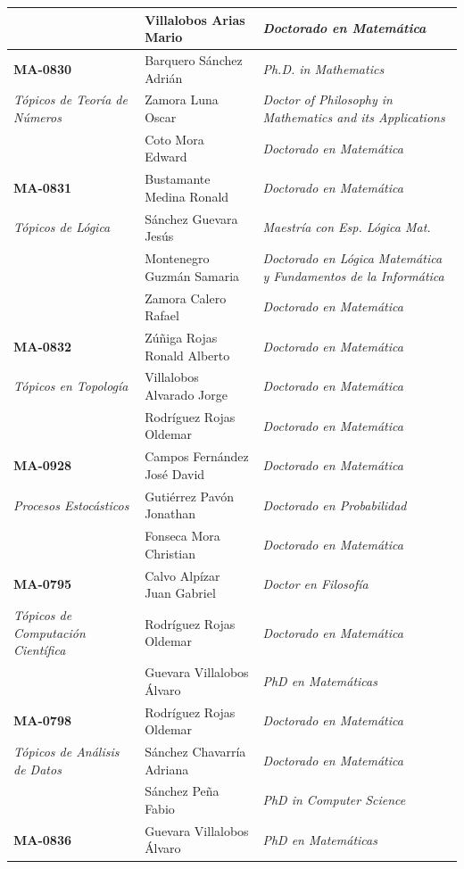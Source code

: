\begin{landscape}
\begin{longtable}{|>{\columncolor{Celeste-UCR!12}\raggedright\arraybackslash}p{6cm}|>{\raggedright\arraybackslash}p{6.6cm}|>{\raggedright\arraybackslash}p{7.6cm}|}
 & Villalobos Arias Mario & \textit{Doctorado en Matemática} \\
\hline
\textbf{MA-0830} & Barquero Sánchez Adrián & \textit{Ph.D. in Mathematics} \\
\textit{Tópicos de Teoría de Números} & Zamora Luna Oscar & \textit{Doctor of Philosophy in Mathematics and its Applications} \\
 & Coto Mora Edward & \textit{Doctorado en Matemática} \\
\hline
\textbf{MA-0831} & Bustamante Medina Ronald & \textit{Doctorado en Matemática} \\
\textit{Tópicos de Lógica} & Sánchez Guevara Jesús & \textit{Maestría con Esp. Lógica Mat.} \\
 & Montenegro Guzmán Samaria & \textit{Doctorado en Lógica Matemática y Fundamentos de la Informática} \\
 & Zamora Calero Rafael & \textit{Doctorado en Matemática} \\
\hline
\textbf{MA-0832} & Zúñiga Rojas Ronald Alberto & \textit{Doctorado en Matemática} \\
\textit{Tópicos en Topología} & Villalobos Alvarado Jorge & \textit{Doctorado en Matemática} \\
 & Rodríguez Rojas Oldemar & \textit{Doctorado en Matemática} \\
\hline
\textbf{MA-0928} & Campos Fernández José David & \textit{Doctorado en Matemática} \\
\textit{Procesos Estocásticos} & Gutiérrez Pavón Jonathan & \textit{Doctorado en Probabilidad} \\
 & Fonseca Mora Christian & \textit{Doctorado en Matemática} \\
\hline
\textbf{MA-0795} & Calvo Alpízar Juan Gabriel & \textit{Doctor en Filosofía} \\
\textit{Tópicos de Computación Científica} & Rodríguez Rojas Oldemar & \textit{Doctorado en Matemática} \\
 & Guevara Villalobos Álvaro & \textit{PhD en Matemáticas} \\
\hline
\textbf{MA-0798} & Rodríguez Rojas Oldemar & \textit{Doctorado en Matemática} \\
\textit{Tópicos de Análisis de Datos} & Sánchez Chavarría Adriana & \textit{Doctorado en Matemática} \\
 & Sánchez Peña Fabio & \textit{PhD in Computer Science} \\
\hline
\textbf{MA-0836} & Guevara Villalobos Álvaro & \textit{PhD en Matemáticas} \\

\end{longtable}
\end{landscape}
